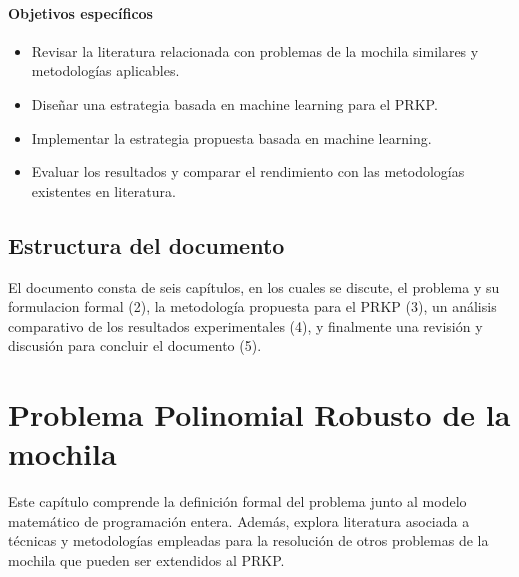 \documentclass[spanish, a4paper, 12pt, openany,final]{book}
\begin{document}
\subsubsection*{Objetivos específicos}
\begin{itemize}
	\item Revisar la literatura relacionada con problemas de la mochila similares y metodologías aplicables.
	\item Diseñar una estrategia basada en machine learning para el PRKP.
	\item Implementar la estrategia propuesta basada en machine learning.
	\item Evaluar los resultados y comparar el rendimiento con las metodologías existentes en literatura.
\end{itemize}

\section{Estructura del documento}

El documento consta de seis capítulos, en los cuales se discute, el problema y su formulacion formal (2), la metodología propuesta para el PRKP (3), un análisis comparativo de los resultados experimentales (4), y finalmente una revisión y discusión para concluir el documento (5).

\clearpage

\chapter{Problema Polinomial Robusto de la mochila}
Este capítulo comprende la definición formal del problema junto al modelo matemático de programación entera. Además, explora literatura asociada a técnicas y metodologías empleadas para la resolución de otros problemas de la mochila que pueden ser extendidos al PRKP.
\end{document}
